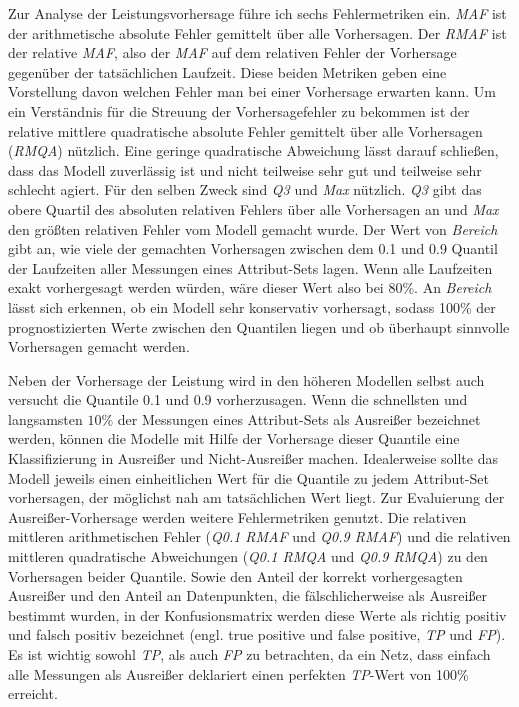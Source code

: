 \documentclass[
	12pt,
	a4paper,
	BCOR10mm,
	DIV14,
	listof=totoc,
	bibliography=totoc,
	headsepline
]{scrreprt}
\begin{document}
Zur Analyse der Leistungsvorhersage führe ich sechs Fehlermetriken ein.
\textit{MAF} ist der arithmetische absolute Fehler gemittelt über alle Vorhersagen.
Der \textit{RMAF} ist der relative \textit{MAF}, also der \textit{MAF} auf dem relativen Fehler der Vorhersage gegenüber der tatsächlichen Laufzeit. Diese beiden Metriken geben eine Vorstellung davon welchen Fehler man bei einer Vorhersage erwarten kann.
Um ein Verständnis für die Streuung der Vorhersagefehler zu bekommen ist der relative mittlere quadratische absolute Fehler gemittelt über alle Vorhersagen (\textit{RMQA}) nützlich. Eine geringe quadratische Abweichung lässt darauf schließen, dass das Modell zuverlässig ist und nicht teilweise sehr gut und teilweise sehr schlecht agiert.
Für den selben Zweck sind \textit{Q3} und \textit{Max} nützlich. \textit{Q3} gibt das obere Quartil des absoluten relativen Fehlers über alle Vorhersagen an und \textit{Max}
den größten relativen Fehler vom Modell gemacht wurde.
Der Wert von \textit{Bereich} gibt an, wie viele der gemachten Vorhersagen zwischen dem 0.1 und 0.9 Quantil der Laufzeiten aller Messungen eines Attribut-Sets lagen. Wenn alle Laufzeiten exakt vorhergesagt werden würden, wäre dieser Wert also bei 80\%. An \textit{Bereich} lässt sich erkennen, ob ein Modell sehr konservativ vorhersagt, sodass 100\% der prognostizierten Werte zwischen den Quantilen liegen und ob überhaupt sinnvolle Vorhersagen gemacht werden.

Neben der Vorhersage der Leistung wird in den höheren Modellen selbst auch versucht die Quantile 0.1 und 0.9 vorherzusagen. Wenn die schnellsten und langsamsten $10\%$ der Messungen eines Attribut-Sets als Ausreißer bezeichnet werden, können die Modelle mit Hilfe der Vorhersage dieser Quantile eine Klassifizierung in Ausreißer und Nicht-Ausreißer machen. Idealerweise sollte das Modell jeweils einen einheitlichen Wert für die Quantile zu jedem Attribut-Set vorhersagen, der möglichst nah am tatsächlichen Wert liegt. Zur Evaluierung der Ausreißer-Vorhersage werden weitere Fehlermetriken genutzt.
Die relativen mittleren arithmetischen Fehler (\textit{Q0.1 RMAF} und \textit{Q0.9 RMAF}) und die relativen mittleren quadratische Abweichungen (\textit{Q0.1 RMQA} und \textit{Q0.9 RMQA}) zu den Vorhersagen beider Quantile.
Sowie den Anteil der korrekt vorhergesagten Ausreißer und den Anteil an Datenpunkten, die fälschlicherweise als Ausreißer bestimmt wurden, in der Konfusionsmatrix werden diese Werte als richtig positiv und falsch positiv bezeichnet (engl. true positive und false positive, \textit{TP} und \textit{FP}).
Es ist wichtig sowohl \textit{TP}, als auch \textit{FP} zu betrachten, da ein Netz, dass einfach alle Messungen als Ausreißer deklariert einen perfekten \textit{TP}-Wert von 100\% erreicht.
\end{document}
